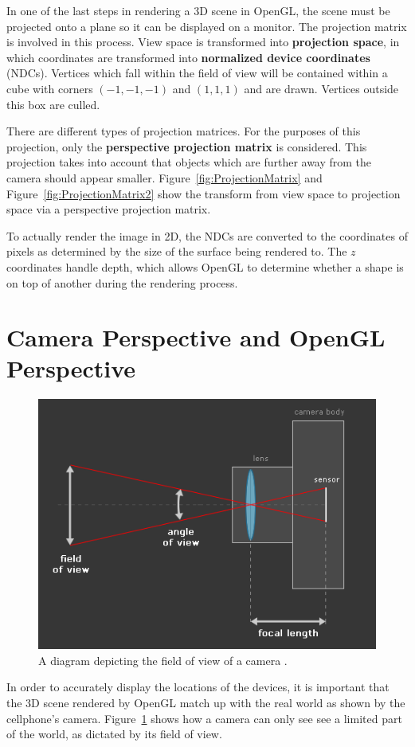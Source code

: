 In one of the last steps in rendering a 3D scene in OpenGL, the scene must be projected onto a plane so it can be displayed on a monitor. The projection matrix is involved in this process. View space is transformed into \textbf{projection space}, in which coordinates are transformed into \textbf{normalized device coordinates} (NDCs). Vertices which fall within the field of view will be contained within a cube with corners $(-1, -1, -1)$ and $(1, 1, 1)$ and are drawn. Vertices outside this box are culled. 

There are different types of projection matrices. For the purposes of this projection, only the \textbf{perspective projection matrix} is considered. This projection takes into account that objects which are further away from the camera should appear smaller. Figure~\ref{fig:ProjectionMatrix} and Figure~\ref{fig:ProjectionMatrix2} show the transform from view space to projection space via a perspective projection matrix.

To actually render the image in 2D, the NDCs are converted to the coordinates of pixels as determined by the size of the surface being rendered to. The $z$ coordinates handle depth, which allows OpenGL to determine whether a shape is on top of another during the rendering process.

\section{Camera Perspective and OpenGL Perspective}
\begin{figure}
	\centering
	\includegraphics[width=\linewidth]{Figures/CameraLens.png}
	\decoRule
	\caption{A diagram depicting the field of view of a camera \cite{MartyBugs}.}
	\label{fig:CameraLens}
\end{figure}
In order to accurately display the locations of the devices, it is important that the 3D scene rendered by OpenGL match up with the real world as shown by the cellphone's camera. Figure~\ref{fig:CameraLens} shows how a camera can only see see a limited part of the world, as dictated by its field of view.

